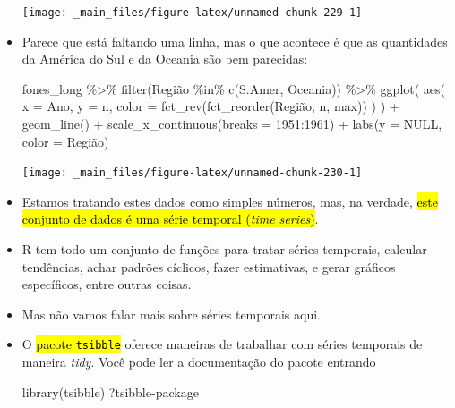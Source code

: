 \documentclass[
  11pt]{report}
\newenvironment{Shaded}{\begin{snugshade}}{\end{snugshade}}
\newcommand{\AttributeTok}[1]{\textcolor[rgb]{0.77,0.63,0.00}{#1}}
\newcommand{\ConstantTok}[1]{\textcolor[rgb]{0.00,0.00,0.00}{#1}}
\newcommand{\DecValTok}[1]{\textcolor[rgb]{0.00,0.00,0.81}{#1}}
\newcommand{\FunctionTok}[1]{\textcolor[rgb]{0.00,0.00,0.00}{#1}}
\newcommand{\NormalTok}[1]{#1}
\newcommand{\SpecialCharTok}[1]{\textcolor[rgb]{0.00,0.00,0.00}{#1}}
\newcommand{\StringTok}[1]{\textcolor[rgb]{0.31,0.60,0.02}{#1}}
\renewenvironment{Shaded}{
    \begin{mdframed}[%
      roundcorner=2pt,%
      innerleftmargin=5pt,%
      innerrightmargin=5pt,%
      topline=true,%
      leftline=true,%
      rightline=true,%
      bottomline=true,%
      linewidth=0.5pt,%
      linecolor=black!20,%
      backgroundcolor=black!2,%
      skipabove=2ex,%
      skipbelow=2.5ex%
    ]%
  }
  {
    \end{mdframed}
  }
\begin{document}
\begin{itemize}
  \begin{center}\texttt{[image: \_main\_files/figure-latex/unnamed-chunk-229-1]} \end{center}
\item
  Parece que está faltando uma linha, mas o que acontece é que as quantidades da América do Sul e da Oceania são bem parecidas:

\begin{Shaded}
\begin{Highlighting}[]
\NormalTok{fones\_long }\SpecialCharTok{\%\textgreater{}\%}
  \FunctionTok{filter}\NormalTok{(Região }\SpecialCharTok{\%in\%} \FunctionTok{c}\NormalTok{(}\StringTok{\textquotesingle{}S.Amer\textquotesingle{}}\NormalTok{, }\StringTok{\textquotesingle{}Oceania\textquotesingle{}}\NormalTok{)) }\SpecialCharTok{\%\textgreater{}\%} 
  \FunctionTok{ggplot}\NormalTok{(}
    \FunctionTok{aes}\NormalTok{(}
      \AttributeTok{x =}\NormalTok{ Ano, }
      \AttributeTok{y =}\NormalTok{ n, }
      \AttributeTok{color =} \FunctionTok{fct\_rev}\NormalTok{(}\FunctionTok{fct\_reorder}\NormalTok{(Região, n, max))}
\NormalTok{    )}
\NormalTok{  ) }\SpecialCharTok{+}
    \FunctionTok{geom\_line}\NormalTok{() }\SpecialCharTok{+}
    \FunctionTok{scale\_x\_continuous}\NormalTok{(}\AttributeTok{breaks =} \DecValTok{1951}\SpecialCharTok{:}\DecValTok{1961}\NormalTok{) }\SpecialCharTok{+}
    \FunctionTok{labs}\NormalTok{(}\AttributeTok{y =} \ConstantTok{NULL}\NormalTok{, }\AttributeTok{color =} \StringTok{\textquotesingle{}Região\textquotesingle{}}\NormalTok{)}
\end{Highlighting}
\end{Shaded}

  \begin{center}\texttt{[image: \_main\_files/figure-latex/unnamed-chunk-230-1]} \end{center}
\item
  Estamos tratando estes dados como simples números, mas, na verdade, {\hl{este conjunto de dados é uma série temporal (\emph{time series})}}.
\item
  R tem todo um conjunto de funções para tratar séries temporais, calcular tendências, achar padrões cíclicos, fazer estimativas, e gerar gráficos específicos, entre outras coisas.
\item
  Mas não vamos falar mais sobre séries temporais aqui.
\item
  O {\hl{pacote {\mbox{\texttt{tsibble}}}}} oferece maneiras de trabalhar com séries temporais de maneira \emph{tidy}. Você pode ler a documentação do pacote entrando

\begin{Shaded}
\begin{Highlighting}[]
\FunctionTok{library}\NormalTok{(tsibble)}
\NormalTok{?}\StringTok{\textasciigrave{}}\AttributeTok{tsibble{-}package}\StringTok{\textasciigrave{}}
\end{Highlighting}
\end{Shaded}
\end{itemize}
\end{document}
